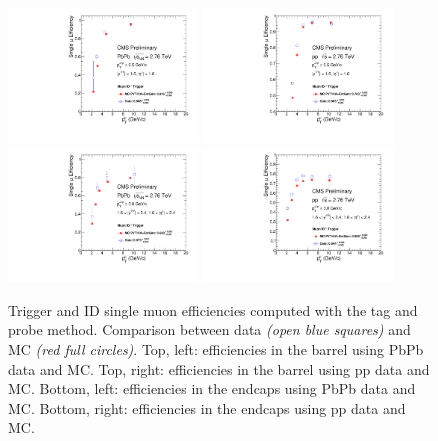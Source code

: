 \begin{figure}
  \begin{center}
    \includegraphics[width=0.45\textwidth]{Chapters/aCorrection/MuIdTrg2_Comp_HI_pt_RD_MC.pdf}
    \includegraphics[width=0.45\textwidth]{Chapters/aCorrection/MuIdTrg2_Comp_pp_pt_RD_MC.pdf}
    \includegraphics[width=0.45\textwidth]{Chapters/aCorrection/MuIdTrg3_Comp_HI_pt_RD_MC.pdf}
    \includegraphics[width=0.45\textwidth]{Chapters/aCorrection/MuIdTrg3_Comp_pp_pt_RD_MC.pdf}
    \caption{Trigger and ID single muon efficiencies computed with the tag and
      probe method. Comparison between data \emph{(open blue squares)} and MC
      \emph{(red full circles)}.
      Top, left: efficiencies in the barrel using PbPb data and MC. Top,
      right: efficiencies in the barrel using pp data and MC.
      Bottom, left: efficiencies in the endcaps using PbPb data and MC.
      Bottom, right: efficiencies in the endcaps using pp data and MC.}
    \label{fig:trigid_eff}
  \end{center}
\end{figure}

